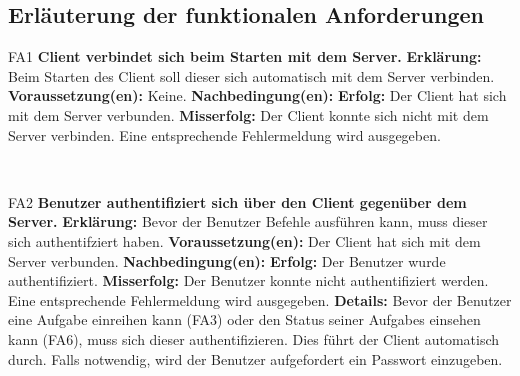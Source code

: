 \documentclass[a4paper,12pt]{article}
\begin{document}
\subsection{Erläuterung der funktionalen Anforderungen}

\begin{itemize}[nosep]
	\leftskip=0.5cm
	\begin{minipage}[t]{\linewidth}
		\item[FA1] \textbf{\gls{Client} verbindet sich beim Starten mit dem \gls{Server}.}
		\subitem \textbf{Erklärung:} Beim Starten des \gls{Client} soll dieser sich automatisch mit dem \gls{Server} verbinden.
		\subitem \textbf{Voraussetzung(en):} Keine.
		\subitem \textbf{Nachbedingung(en):}
		\subsubitem \textbf{Erfolg:} Der \gls{Client} hat sich mit dem \gls{Server} verbunden.
		\subsubitem \textbf{Misserfolg:} Der \gls{Client} konnte sich nicht mit dem \gls{Server} verbinden. Eine entsprechende Fehlermeldung wird ausgegeben.
	\end{minipage}
	\newline
	\\
	
	\begin{minipage}[t]{\linewidth}
		\item[FA2] \textbf{Benutzer authentifiziert sich über den \gls{Client} gegenüber dem \gls{Server}.}
		\subitem \textbf{Erklärung:} Bevor der \gls{Benutzer} Befehle ausführen kann, muss dieser sich authentifziert haben.
		\subitem \textbf{Voraussetzung(en):} Der \gls{Client} hat sich mit dem \gls{Server} verbunden.
		\subitem \textbf{Nachbedingung(en):} 
		\subsubitem \textbf{Erfolg:} Der \gls{Benutzer} wurde authentifiziert.
		\subsubitem \textbf{Misserfolg:} Der \gls{Benutzer} konnte nicht authentifiziert werden. Eine entsprechende Fehlermeldung wird ausgegeben.
		\subitem \textbf{Details:} Bevor der \gls{Benutzer} eine \gls{Aufgabe} einreihen kann (FA3) oder den Status seiner \glspl{Aufgabe} einsehen kann (FA6), muss sich dieser authentifizieren. Dies führt der \gls{Client} automatisch durch. Falls notwendig, wird der \gls{Benutzer} aufgefordert ein Passwort einzugeben.
	\end{minipage}
    \newline
    \\
    

\end{itemize}
\end{document}
